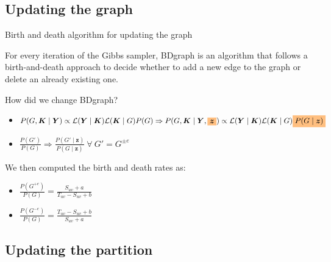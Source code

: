 \subsection{Updating the graph}
\begin{frame}{Birth and death algorithm for updating the graph}

    For every iteration of the Gibbs sampler, BDgraph is an algorithm that follows a birth-and-death approach to decide whether to add a new edge to the graph or delete an already existing one.
    
    How did we change BDgraph?
    \begin{itemize}
        \item $P(G,\bm{K} \mid \bm{Y}) \propto \mathcal{L}(\bm{Y} \mid \bm{K})\mathcal{L}
        (\bm{K} \mid {G})P(G) \Rightarrow P(G,\bm{K} \mid \bm{Y}, \highlight{\bm{z}}) \propto \mathcal{L}(\bm{Y} \mid \bm{K})\mathcal{L}(\bm{K} \mid {G})\highlight{P(G \mid \bm{z})}$
        \item $\frac{P(G')}{P(G)} \Rightarrow \frac{P(G' \mid \bm{z})}{P(G \mid \bm{z})}\:\forall\:G' = G^{\pm e}$
    \end{itemize}

    We then computed the birth and death rates as:
    \begin{itemize}
        \item $\frac{P(G^{+ e})}{P(G)} = \frac{S_{uv} + a}{T_{uv} - S_{uv} + b}$
        \item $\frac{P(G^{- e})}{P(G)} = \frac{T_{uv} - S_{uv} + b}{S_{uv} + a}$
    \end{itemize}
    
\end{frame}


\subsection{Updating the partition}


